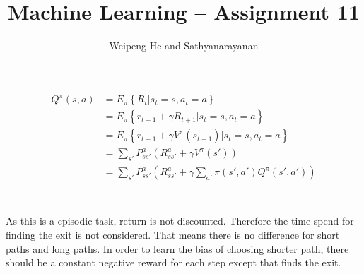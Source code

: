\documentclass{article}[11pt]
\title{Machine Learning -- Assignment 11}
\author{Weipeng He and Sathyanarayanan}
\begin{document}
\maketitle

\section{}

\section{}

\section{}

\section{}
\begin{align*}
  Q^\pi(s,a) &= E_\pi \left\{ R_t | s_t = s, a_t = a \right\} \\
  &= E_\pi \left\{ r_{t+1} + \gamma R_{t+1} | s_t = s, a_t = a \right\} \\
  &= E_\pi \left\{ r_{t+1} + \gamma V^\pi(s_{t+1}) | s_t = s, a_t = a \right\} \\
  &= \sum_{s'} P_{ss'}^{a} \left( R_{ss'}^{a} + \gamma V^\pi(s') \right) \\
  &= \sum_{s'} P_{ss'}^{a} \left( R_{ss'}^{a} + \gamma \sum_{a'} \pi(s', a') Q^\pi(s', a') \right) \\
\end{align*}

\section{}
As this is a episodic task, return is not discounted. Therefore the time spend for finding the exit is not considered. That means there is no difference for short paths and long paths. In order to learn the bias of choosing shorter path, there should be a constant negative reward for each step except that finds the exit.
\end{document}
